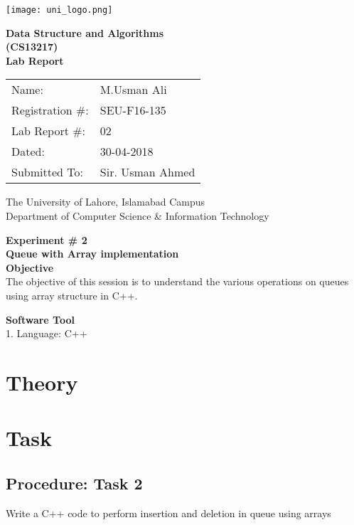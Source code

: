 \documentclass[11pt]{article}            %
\begin{document}
\begin{titlepage}
    \centering
  \vfill
    \texttt{[image: uni\_logo.png]} \\ 
	\vskip2cm
    {\bfseries\Large
	Data Structure and Algorithms \\ (CS13217)\\
	
	\vskip2cm
	Lab Report 
	 
	\vskip2cm
	}    

\begin{center}
\begin{tabular}{ l l  } 

Name: & M.Usman Ali \\ 
Registration \#: & SEU-F16-135 \\ 
Lab Report \#: & 02 \\ 
 Dated:& 30-04-2018\\ 
Submitted To:& Sir. Usman Ahmed\\ 

\end{tabular}
\end{center}
    \vfill
    The University of Lahore, Islamabad Campus\\
Department of Computer Science \& Information Technology
\end{titlepage}


    
    {\bfseries\Large
\centering
	Experiment \# 2 \\

Queue with Array implementation \\
	
	}    
 \vskip1cm
 \textbf {Objective}\\ The objective of this session is to understand the various operations on queues using array structure in C++. 
 
 \textbf {Software Tool} \\
1. Language: C++\\

\section{Theory }              


\section{Task}  
\subsection{Procedure: Task 2 }     
Write a C++ code to perform insertion and deletion in queue using arrays
\end{document}
